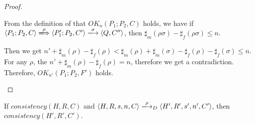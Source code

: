 \begin{proof}
\begin{itemize}
  From the definition of that \(OK_n(P_1;P_2, C)\) holds, we have if
  \( \langle P_1;P_2, C \rangle \xLongrightarrow{\rho} \langle
  P_1';P_2, C' \rangle \xlongrightarrow{\sigma} \langle Q, C'' \rangle
  \), then \(\sharp_m(\rho\sigma) - \sharp_f(\rho\sigma) \le n \).

  Then we get \( n' + \sharp_m(\rho) - \sharp_f(\rho) <
  \sharp_m(\rho) + \sharp_m(\sigma) - \sharp_f(\rho) -
  \sharp_f(\sigma) \le n\). For any \(\rho\), the \( n' +
  \sharp_m(\rho) - \sharp_f(\rho) = n\), therefore we get a
  contradiction. Therefore, \(OK_{n'}(P_1;P_2, F')\) holds.

\end{itemize}
\end{proof}

\begin{lemma}
\label{lem:consistency}
If \(consistency(H, R, C)\) and \(\langle H, R, s, n, C \rangle
\xlongrightarrow{\rho}_D \langle H', R', s', n', C'\rangle \), then
\(consistency(H', R', C')\).
\end{lemma}


